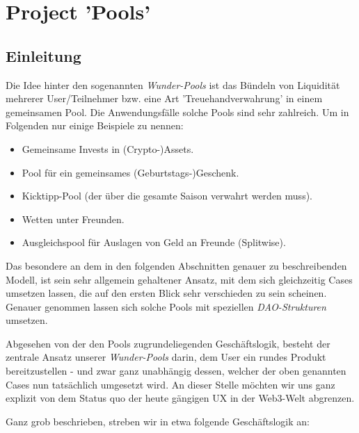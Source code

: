 \section{Project 'Pools'}
\label{sec:pools}

\subsection{Einleitung}

\vspace{0.3cm}

Die Idee hinter den sogenannten \textit{Wunder-Pools} ist das Bündeln von Liquidität mehrerer User/Teilnehmer bzw. eine Art 'Treuehandverwahrung' in einem gemeinsamen Pool. Die Anwendungsfälle solche Pools sind sehr zahlreich. Um in Folgenden nur einige Beispiele zu nennen:  

\begin{itemize}
  \item Gemeinsame Invests in (Crypto-)Assets.
  \item Pool für ein gemeinsames (Geburtstags-)Geschenk.
  \item Kicktipp-Pool (der über die gesamte Saison verwahrt werden muss).
  \item Wetten unter Freunden.
  \item Ausgleichspool für Auslagen von Geld an Freunde (Splitwise).
\end{itemize}

\vspace{0.2cm}

Das besondere an dem in den folgenden Abschnitten genauer zu beschreibenden Modell, ist sein sehr allgemein gehaltener Ansatz, mit dem sich gleichzeitig Cases umsetzen lassen, die auf den ersten Blick sehr verschieden zu sein scheinen. Genauer genommen lassen sich solche Pools mit speziellen \textit{DAO-Strukturen} umsetzen.

Abgesehen von der den Pools zugrundeliegenden Geschäftslogik, besteht der zentrale Ansatz unserer \textit{Wunder-Pools} darin, dem User ein rundes Produkt bereitzustellen - und zwar ganz unabhängig dessen, welcher der oben genannten Cases nun tatsächlich umgesetzt wird. An dieser Stelle möchten wir uns ganz explizit von dem Status quo der heute gängigen UX in der Web3-Welt abgrenzen.

\vspace{0.2cm}

Ganz grob beschrieben, streben wir in etwa folgende Geschäftslogik an:

